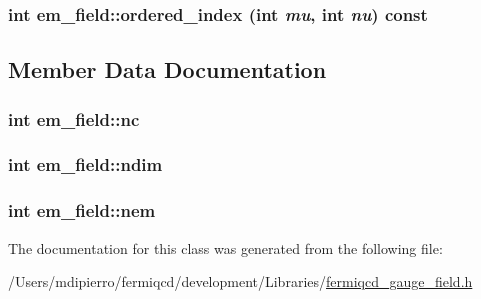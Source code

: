 \label{classem__field_a4afce0ed26593545c4a61892880823bc}
\hypertarget{classem__field_a3f93a7ad7324b58e5554ac996fa12282}{
\subsubsection[{ordered\_\-index}]{\setlength{\rightskip}{0pt plus 5cm}int em\_\-field::ordered\_\-index (int {\em mu}, \/  int {\em nu}) const}}
\label{classem__field_a3f93a7ad7324b58e5554ac996fa12282}


\subsection{Member Data Documentation}
\hypertarget{classem__field_ab6fc146b5a94cf5961a133e55f832cd4}{
\subsubsection[{nc}]{\setlength{\rightskip}{0pt plus 5cm}int {\bf em\_\-field::nc}}}
\label{classem__field_ab6fc146b5a94cf5961a133e55f832cd4}
\hypertarget{classem__field_ad35fcd68bba9a301d34ceabc76f08226}{
\subsubsection[{ndim}]{\setlength{\rightskip}{0pt plus 5cm}int {\bf em\_\-field::ndim}}}
\label{classem__field_ad35fcd68bba9a301d34ceabc76f08226}
\hypertarget{classem__field_ab0049c2b2edc267a93c9299aecede037}{
\subsubsection[{nem}]{\setlength{\rightskip}{0pt plus 5cm}int {\bf em\_\-field::nem}}}
\label{classem__field_ab0049c2b2edc267a93c9299aecede037}


The documentation for this class was generated from the following file:\begin{DoxyCompactItemize}
\item 
/Users/mdipierro/fermiqcd/development/Libraries/\hyperlink{fermiqcd__gauge__field_8h}{fermiqcd\_\-gauge\_\-field.h}\end{DoxyCompactItemize}
